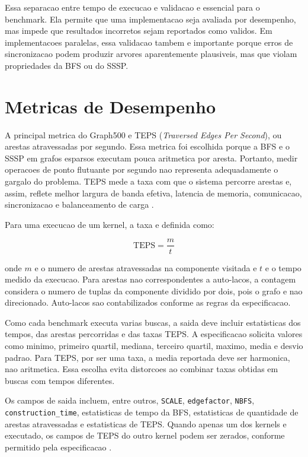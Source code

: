 Essa separacao entre tempo de execucao e validacao e essencial para o benchmark.
Ela permite que uma implementacao seja avaliada por desempenho, mas impede que
resultados incorretos sejam reportados como validos. Em implementacoes paralelas,
essa validacao tambem e importante porque erros de sincronizacao podem produzir
arvores aparentemente plausiveis, mas que violam propriedades da BFS ou do SSSP.

\section{Metricas de Desempenho}

A principal metrica do Graph500 e TEPS (\textit{Traversed Edges Per Second}), ou
arestas atravessadas por segundo. Essa metrica foi escolhida porque a BFS e o
SSSP em grafos esparsos executam pouca aritmetica por aresta. Portanto, medir
operacoes de ponto flutuante por segundo nao representa adequadamente o gargalo
do problema. TEPS mede a taxa com que o sistema percorre arestas e, assim,
reflete melhor largura de banda efetiva, latencia de memoria, comunicacao,
sincronizacao e balanceamento de carga \cite{graph500spec}.

Para uma execucao de um kernel, a taxa e definida como:

\begin{equation}
\mathrm{TEPS} = \frac{m}{t}
\end{equation}

onde $m$ e o numero de arestas atravessadas na componente visitada e $t$ e o
tempo medido da execucao. Para arestas nao correspondentes a auto-lacos, a
contagem considera o numero de tuplas da componente dividido por dois, pois o
grafo e nao direcionado. Auto-lacos sao contabilizados conforme as regras da
especificacao.

Como cada benchmark executa varias buscas, a saida deve incluir estatisticas dos
tempos, das arestas percorridas e das taxas TEPS. A especificacao solicita
valores como minimo, primeiro quartil, mediana, terceiro quartil, maximo, media e
desvio padrao. Para TEPS, por ser uma taxa, a media reportada deve ser harmonica,
nao aritmetica. Essa escolha evita distorcoes ao combinar taxas obtidas em buscas
com tempos diferentes.

Os campos de saida incluem, entre outros, \texttt{SCALE}, \texttt{edgefactor},
\texttt{NBFS}, \texttt{construction\_time}, estatisticas de tempo da BFS,
estatisticas de quantidade de arestas atravessadas e estatisticas de TEPS. Quando
apenas um dos kernels e executado, os campos de TEPS do outro kernel podem ser
zerados, conforme permitido pela especificacao \cite{graph500spec}.

